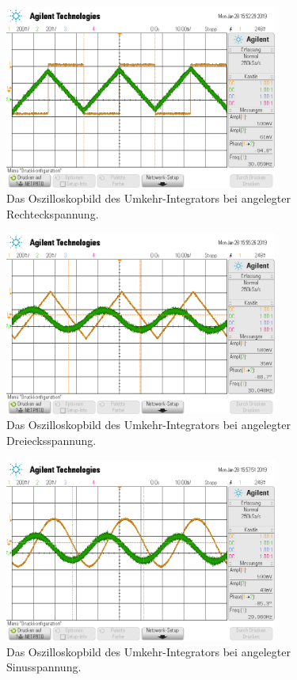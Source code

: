 \begin{figure}
  \centering
  \includegraphics[width=0.8\textwidth]{Schlager/scope_16.png}
  \caption{Das Oszilloskopbild des Umkehr-Integrators bei angelegter Rechteckspannung.}
  \label{fig:int_recht}
\end{figure}
\begin{figure}
  \centering
  \includegraphics[width=0.8\textwidth]{Schlager/scope_17.png}
  \caption{Das Oszilloskopbild des Umkehr-Integrators bei angelegter Dreiecksspannung.}
  \label{fig:int_drei}
\end{figure}
\begin{figure}
  \centering
  \includegraphics[width=0.8\textwidth]{Schlager/scope_18.png}
  \caption{Das Oszilloskopbild des Umkehr-Integrators bei angelegter Sinusspannung.}
  \label{fig:int_sin}
\end{figure}

